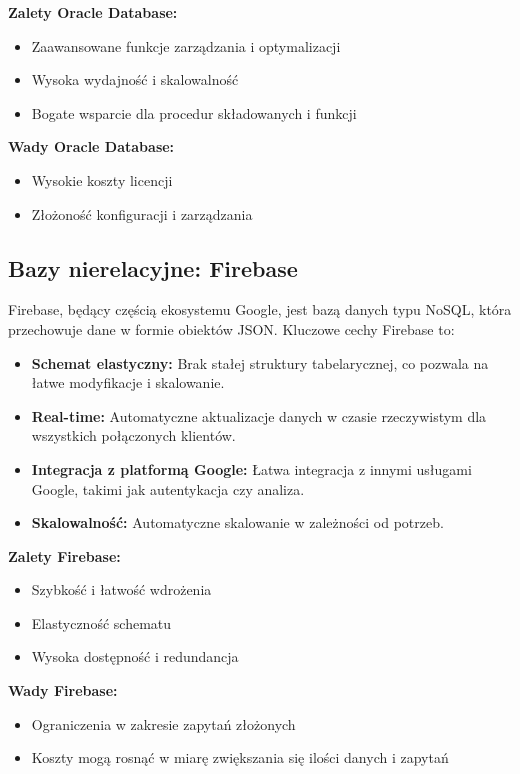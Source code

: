 \textbf{Zalety Oracle Database:}
\begin{itemize}
\item Zaawansowane funkcje zarządzania i optymalizacji
\item Wysoka wydajność i skalowalność
\item Bogate wsparcie dla procedur składowanych i funkcji
\end{itemize}

\textbf{Wady Oracle Database:}
\begin{itemize}
\item Wysokie koszty licencji
\item Złożoność konfiguracji i zarządzania
\end{itemize}

\subsection{Bazy nierelacyjne: Firebase}

Firebase, będący częścią ekosystemu Google, jest bazą danych typu NoSQL, która przechowuje dane w formie obiektów JSON. Kluczowe cechy Firebase to:

\begin{itemize}
\item \textbf{Schemat elastyczny:} Brak stałej struktury tabelarycznej, co pozwala na łatwe modyfikacje i skalowanie.
\item \textbf{Real-time:} Automatyczne aktualizacje danych w czasie rzeczywistym dla wszystkich połączonych klientów.
\item \textbf{Integracja z platformą Google:} Łatwa integracja z innymi usługami Google, takimi jak autentykacja czy analiza.
\item \textbf{Skalowalność:} Automatyczne skalowanie w zależności od potrzeb.
\end{itemize}

\textbf{Zalety Firebase:}
\begin{itemize}
\item Szybkość i łatwość wdrożenia
\item Elastyczność schematu
\item Wysoka dostępność i redundancja
\end{itemize}

\textbf{Wady Firebase:}
\begin{itemize}
\item Ograniczenia w zakresie zapytań złożonych
\item Koszty mogą rosnąć w miarę zwiększania się ilości danych i zapytań\cite{firebaseDb}
\end{itemize}
